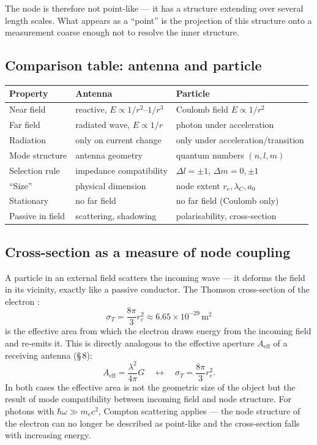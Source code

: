 The node is therefore not point-like --- it has a structure extending over
several length scales. What appears as a ``point'' is the projection of
this structure onto a measurement coarse enough not to resolve the inner
structure.

\subsection*{Comparison table: antenna and particle}

\begin{center}
\begin{tabular}{@{}lp{2.4cm}p{2.4cm}@{}}
\toprule
\textbf{Property} & \textbf{Antenna} & \textbf{Particle} \\
\midrule
Near field & reactive, $E\propto 1/r^2$--$1/r^3$ & Coulomb field $E\propto 1/r^2$ \\
Far field & radiated wave, $E\propto 1/r$ & photon under acceleration \\
Radiation & only on current change & only under acceleration/transition \\
Mode structure & antenna geometry & quantum numbers $(n,l,m)$ \\
Selection rule & impedance compatibility & $\Delta l=\pm1$, $\Delta m=0,\pm1$ \\
``Size'' & physical dimension & node extent $r_e,\lambda_C,a_0$ \\
Stationary & no far field & no far field (Coulomb only) \\
Passive in field & scattering, shadowing & polarisability, cross-section \\
\bottomrule
\end{tabular}
\end{center}

\subsection*{Cross-section as a measure of node coupling}

A particle in an external field scatters the incoming wave --- it deforms
the field in its vicinity, exactly like a passive conductor. The Thomson
cross-section of the electron \cite{Jackson1999}:
\[
  \sigma_T = \frac{8\pi}{3}r_e^2 \approx 6.65\times 10^{-29}\,\mathrm{m}^2
\]
is the effective area from which the electron draws energy from the
incoming field and re-emits it. This is directly analogous to the effective
aperture $A_\mathrm{eff}$ of a receiving antenna (\S\,8):
\[
  A_\mathrm{eff} = \frac{\lambda^2}{4\pi}G
  \quad \longleftrightarrow \quad
  \sigma_T = \frac{8\pi}{3}r_e^2.
\]
In both cases the effective area is not the geometric size of the object
but the result of mode compatibility between incoming field and node
structure. For photons with $\hbar\omega \gg m_e c^2$, Compton scattering
applies --- the node structure of the electron can no longer be described
as point-like and the cross-section falls with increasing energy.

